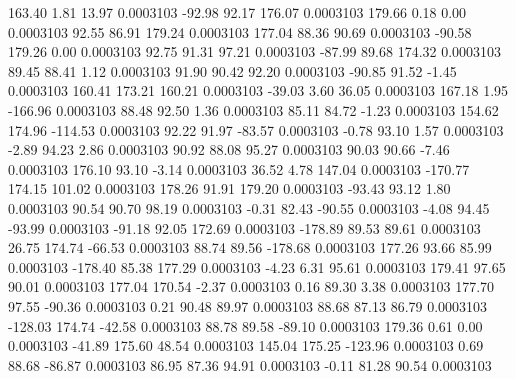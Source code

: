       163.40        1.81       13.97     0.0003103
      -92.98       92.17      176.07     0.0003103
      179.66        0.18        0.00     0.0003103
       92.55       86.91      179.24     0.0003103
      177.04       88.36       90.69     0.0003103
      -90.58      179.26        0.00     0.0003103
       92.75       91.31       97.21     0.0003103
      -87.99       89.68      174.32     0.0003103
       89.45       88.41        1.12     0.0003103
       91.90       90.42       92.20     0.0003103
      -90.85       91.52       -1.45     0.0003103
      160.41      173.21      160.21     0.0003103
      -39.03        3.60       36.05     0.0003103
      167.18        1.95     -166.96     0.0003103
       88.48       92.50        1.36     0.0003103
       85.11       84.72       -1.23     0.0003103
      154.62      174.96     -114.53     0.0003103
       92.22       91.97      -83.57     0.0003103
       -0.78       93.10        1.57     0.0003103
       -2.89       94.23        2.86     0.0003103
       90.92       88.08       95.27     0.0003103
       90.03       90.66       -7.46     0.0003103
      176.10       93.10       -3.14     0.0003103
       36.52        4.78      147.04     0.0003103
     -170.77      174.15      101.02     0.0003103
      178.26       91.91      179.20     0.0003103
      -93.43       93.12        1.80     0.0003103
       90.54       90.70       98.19     0.0003103
       -0.31       82.43      -90.55     0.0003103
       -4.08       94.45      -93.99     0.0003103
      -91.18       92.05      172.69     0.0003103
     -178.89       89.53       89.61     0.0003103
       26.75      174.74      -66.53     0.0003103
       88.74       89.56     -178.68     0.0003103
      177.26       93.66       85.99     0.0003103
     -178.40       85.38      177.29     0.0003103
       -4.23        6.31       95.61     0.0003103
      179.41       97.65       90.01     0.0003103
      177.04      170.54       -2.37     0.0003103
        0.16       89.30        3.38     0.0003103
      177.70       97.55      -90.36     0.0003103
        0.21       90.48       89.97     0.0003103
       88.68       87.13       86.79     0.0003103
     -128.03      174.74      -42.58     0.0003103
       88.78       89.58      -89.10     0.0003103
      179.36        0.61        0.00     0.0003103
      -41.89      175.60       48.54     0.0003103
      145.04      175.25     -123.96     0.0003103
        0.69       88.68      -86.87     0.0003103
       86.95       87.36       94.91     0.0003103
       -0.11       81.28       90.54     0.0003103
